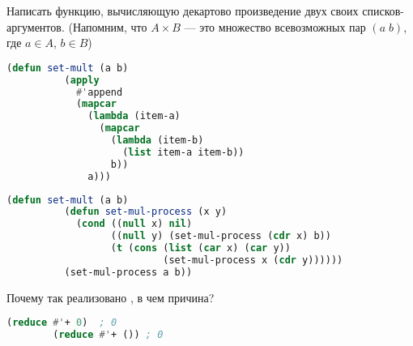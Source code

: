 \documentclass[a4paper,oneside,12pt]{extreport}
\begin{document}
\begin{task}
	Написать функцию, вычисляющую декартово произведение двух своих списков-аргументов.
	(Напомним, что $A\times B$ — это множество всевозможных пар $(a\;b)$, где $a\in A$, $b\in B$)

	\begin{lstlisting}[language=Lisp, gobble=16]
		(defun set-mult (a b)
		  (apply
		    #'append
		    (mapcar
		      (lambda (item-a)
		        (mapcar
		          (lambda (item-b)
		            (list item-a item-b))
		          b))
		      a)))
	\end{lstlisting}

	\begin{lstlisting}[language=Lisp, gobble=16]
		(defun set-mult (a b)
		  (defun set-mul-process (x y)
		    (cond ((null x) nil)
		          ((null y) (set-mul-process (cdr x) b))
		          (t (cons (list (car x) (car y))
		                   (set-mul-process x (cdr y))))))
		  (set-mul-process a b))
	\end{lstlisting}
\end{task}

\begin{task}
	Почему так реализовано , в чем причина?

	\begin{lstlisting}[language=Lisp, gobble=16]
		(reduce #'+ 0)  ; 0
		(reduce #'+ ()) ; 0
	\end{lstlisting}
\end{task}
\end{document}
